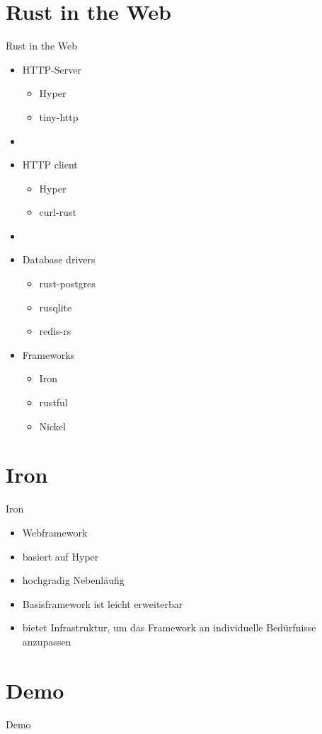 \documentclass{beamer}
\begin{document}
\section{Rust in the Web}

\begin{frame}{Rust in the Web}

\begin{minipage}[t]{.45\textwidth}
\begin{itemize}
  \item HTTP-Server
  \begin{itemize}
    \item Hyper
    \item tiny-http
  \end{itemize}
  \item []
  \item HTTP client
  \begin{itemize}
    \item Hyper
    \item curl-rust
  \end{itemize} 
  \item []
  \item Database drivers
  \begin{itemize}
    \item rust-postgres
    \item rusqlite
    \item redis-rs
  \end{itemize}
\end{itemize}
\end{minipage}
\hfill
\begin{minipage}[t]{.45\textwidth}
\begin{itemize}
\item Frameworks
  \begin{itemize}
    \item Iron
    \item rustful
    \item Nickel
  \end{itemize}  
\end{itemize}
\end{minipage}

\end{frame}

\section{Iron}
\begin{frame}{Iron}
\begin{itemize}
    \item Webframework
    \item basiert auf Hyper
    \item hochgradig Nebenläufig
    \item Basisframework ist leicht erweiterbar
    \item bietet Infrastruktur, um das Framework an individuelle Bedürfnisse anzupassen
\end{itemize}

\end{frame}


\section{Demo}
\begin{frame}{Demo}

\end{frame}
\end{document}
